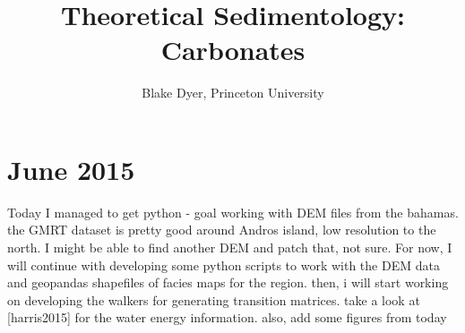 \documentclass[12pt]{article}
\title{\sffamily \Huge Theoretical Sedimentology: Carbonates}
\author{\sffamily Blake Dyer, Princeton University}
\date{}                                           %
\begin{document}
\maketitle
\thispagestyle{empty}
\vspace{6em}


\newpage

\setcounter{page}{1}
\section*{ June 2015}
Today I managed to get python - goal working with DEM files from the bahamas.  the GMRT dataset is pretty good around Andros island, low resolution to the north.  I might be able to find another DEM and patch that, not sure.  For now, I will continue with developing some python scripts to work with the DEM data and geopandas shapefiles of facies maps for the region.  then, i will start working on developing the walkers for generating transition matrices.  take a look at [harris2015] for the water energy information.  also, add some figures from today

\end{document}
